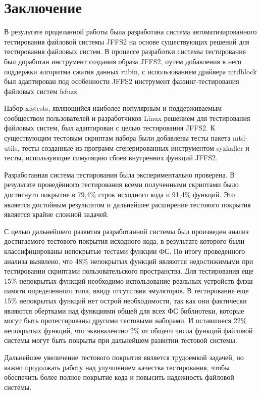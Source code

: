\section{Заключение}
\label{sec:Chapter5} 

В результате проделанной работы была разработана система автоматизированного тестирования файловой системы JFFS2 на основе существующих решений для тестирования файловых систем. В процессе разработки системы тестирования был доработан инструмент создания образа JFFS2, путем добавления в него поддержки алгоритма сжатия данных rubin, с использованием драйвера mtdblock был адаптирован под особенности JFFS2 инструмент фаззинг-тестирования файловых систем fsfuzz. 

Набор xfstests, являющийся наиболее популярным и поддерживаемым сообществом пользователей и разработчиков Linux решением для тестирования файловых систем, был адаптирован с целью тестирования JFFS2. К существующим тестовым скриптам набора были добавлены тесты пакета mtd-utils, тесты созданные из программ сгенерированных инструментом syzkaller и тесты, использующие симуляцию сбоев внутренних функций JFFS2.

Разработанная система тестирования была экспериментально проверена. В результате проведённого тестирования всеми полученными скриптами было достигнуто покрытие в 79,4\% строк исходного кода и 91,4\% функций. Это является достойным результатом и дальнейшее расширение тестового покрытия является крайне сложной задачей.

С целью дальнейшего развития разработанной системы был произведен анализ достигаемого тестового покрытия исходного кода, в результате которого были классифицированы непокрытые тестами функции ФС. По итогу проведенного анализа выявлено, что 48\% непокрытых функций являются недостижимыми при тестировании скриптами пользовательского пространства. Для тестирования еще 15\% непокрытых функций необходимо использование реальных устройств флэш-памяти определенного типа, ввиду отсутствия эмуляторов. В тестирование еще 15\% непокрытых функций нет острой необходимости, так как они фактически являются обертками над функциями общей для всех ФС библиотеки, которые могут быть протестированы другими тестовыми наборами. И оставшиеся 22\% непокрытых функций, что эквивалентно 2\% от общего числа функций файловой системы могут быть покрыты при дальнейшем развитии тестовой системы. 

Дальнейшее увеличение тестового покрытия является трудоемкой задачей, но важно продолжать работу над улучшением качества тестирования, чтобы обеспечить более полное покрытие кода и повысить надежность файловой системы.

\newpage
